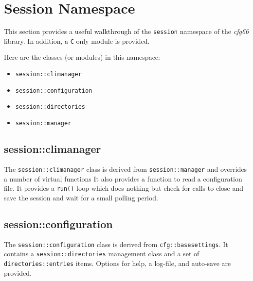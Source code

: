 %
%
%

\section{Session Namespace}
\label{sec:session_namespace}

   This section provides a useful walkthrough of the \texttt{session} namespace of
   the \textsl{cfg66} library.
   In addition, a \texttt{C}-only module is provided.

   Here are the classes (or modules) in this namespace:

   \begin{itemize}
      \item \texttt{session::climanager}
      \item \texttt{session::configuration}
      \item \texttt{session::directories}
      \item \texttt{session::manager}
   \end{itemize}

\subsection{session::climanager}
\label{subsec:session_namespace_climanager}

   The \texttt{session::climanager} class is derived from
   \texttt{session::manager} and overrides a number of virtual functions
   It also provides a function to read a configuration file.
   It provides a \texttt{run()} loop which does nothing
   but check for calls to close and save the session and wait for a small
   polling period.

\subsection{session::configuration}
\label{subsec:session_namespace_configuration}

   The \texttt{session::configuration} class is derived from
   \texttt{cfg::basesettings}.
   It contains a \texttt{session::directories} management class
   and a set of
   \texttt{directories::entries} items.
   Options for help, a log-file, and auto-save are provided.

